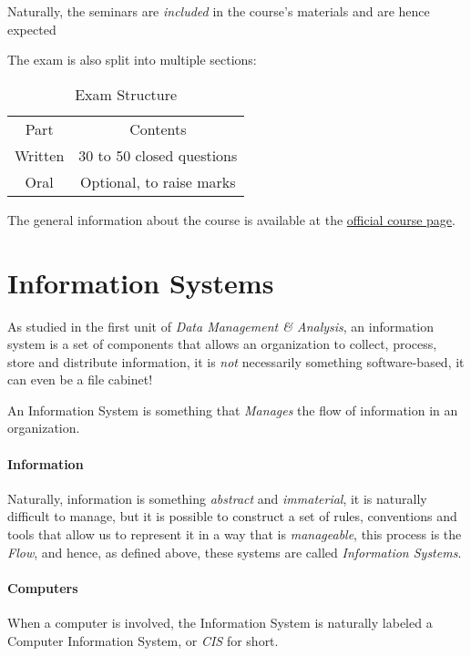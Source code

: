 \documentclass[openright, twoside, twocolumn]{report}
\begin{document}
    Naturally, the seminars are \emph{included} in the course's materials and are hence expected

    The exam is also split into multiple sections:

    \begin{table}[h!]
      \centering
      \begin{tabular}{c c}
          \rowcolor{gray!50}
          Part & Contents  \\
          Written & 30 to 50 closed questions  \\
          Oral & Optional, to raise marks \\
      \end{tabular}
      \caption{Exam Structure}
      \label{tab:label}
    \end{table}

    The general information about the course is available at the \href{http://wwwusers.di.uniroma1.it/~cilli/}{official course page}.


    \section{Information Systems}

    As studied in the first unit of \emph{Data Management \& Analysis}, an information system is a set of components that allows an organization
    to collect, process, store and distribute information, it is \emph{not} necessarily something software-based, it can even be
    a file cabinet!

    \begin{definition}\label{def:is}
      An Information System is something that \emph{Manages} the flow of information in an organization.
    \end{definition}

    \paragraph{Information}
    Naturally, information is something \emph{abstract} and \emph{immaterial}, it is naturally difficult to manage, but it is possible
    to construct a set of rules, conventions and tools that allow us to represent it in a way that is \emph{manageable}, this process
    is the \emph{Flow}, and hence, as defined above, these systems are called \emph{Information Systems}.

    \paragraph{Computers}
    When a computer is involved, the Information System is naturally labeled a Computer Information System, or \emph{CIS} for short.
\end{document}
